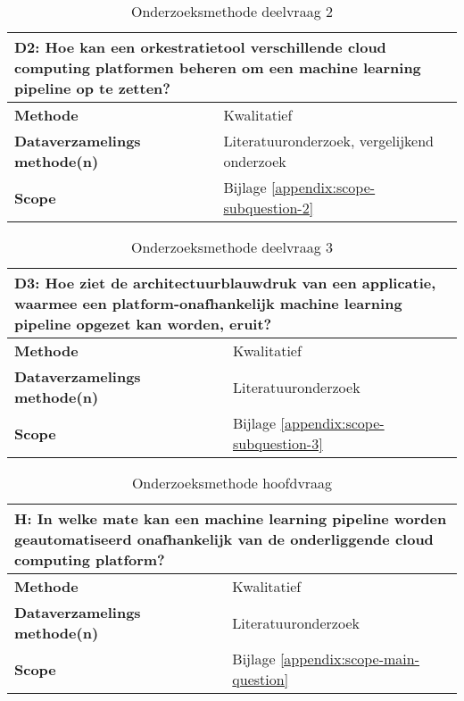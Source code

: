 \begin{table}[hbt!]
  \centering
  \caption{Onderzoeksmethode deelvraag 2}
  \vspace*{.5\baselineskip}
  \begin{tabular}{|p{.215\linewidth}|p{.72\linewidth}|}
  \hline
  \multicolumn{2}{|p{.97\linewidth}|}{\textbf{D2: Hoe kan een orkestratietool verschillende cloud computing platformen beheren om een machine learning pipeline op te zetten?}} \\ \hline
    \textbf{Methode}&
      Kwalitatief
    \\ \hline
    \textbf{Dataverzamelings methode(n)}&
      Literatuuronderzoek, vergelijkend onderzoek
    \\ \hline
    \textbf{Scope}&
      Bijlage \ref{appendix:scope-subquestion-2}
    \\ \hline
  \end{tabular}
  \label{table:sq2}
\end{table}

\begin{table}[hbt!]
  \centering
  \caption{Onderzoeksmethode deelvraag 3}
  \vspace*{.5\baselineskip}
  \begin{tabular}{|p{.215\linewidth}|p{.72\linewidth}|}
  \hline
  \multicolumn{2}{|p{.97\linewidth}|}{\textbf{D3: Hoe ziet de architectuurblauwdruk van een applicatie, waarmee een platform-onafhankelijk machine learning pipeline opgezet kan worden, eruit?}} \\ \hline
    \textbf{Methode}&
      Kwalitatief
    \\ \hline
    \textbf{Dataverzamelings methode(n)}&
      Literatuuronderzoek
    \\ \hline
    \textbf{Scope}&
      Bijlage \ref{appendix:scope-subquestion-3}
    \\ \hline
  \end{tabular}
  \label{table:sq3}
\end{table}

\space
\newpage

\begin{table}[hbt!]
  \centering
  \caption{Onderzoeksmethode hoofdvraag}
  \vspace*{.5\baselineskip}
  \begin{tabular}{|p{.215\linewidth}|p{.72\linewidth}|}
  \hline
  \multicolumn{2}{|p{.97\linewidth}|}{\textbf{H: In welke mate kan een machine learning pipeline worden geautomatiseerd onafhankelijk van de onderliggende cloud computing platform?}} \\ \hline
    \textbf{Methode}&
      Kwalitatief
    \\ \hline
    \textbf{Dataverzamelings methode(n)}&
      Literatuuronderzoek
    \\ \hline
    \textbf{Scope}&
      Bijlage \ref{appendix:scope-main-question}
    \\ \hline
  \end{tabular}
  \label{table:mq}
\end{table}